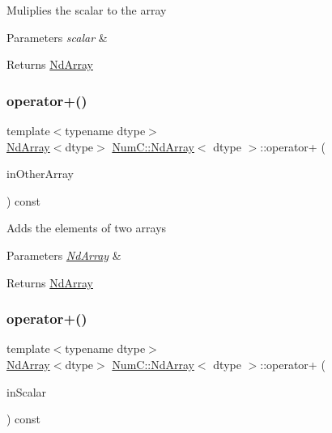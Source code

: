 Muliplies the scalar to the array


\begin{DoxyParams}{Parameters}
{\em scalar} & \\
\hline
\end{DoxyParams}
\begin{DoxyReturn}{Returns}
\mbox{\hyperlink{class_num_c_1_1_nd_array}{Nd\+Array}} 
\end{DoxyReturn}
\mbox{\label{class_num_c_1_1_nd_array_a910f4bbf7dc623d98a633c9490eb83c1}} 
\subsubsection{\texorpdfstring{operator+()}{operator+()}\hspace{0.1cm}{\footnotesize\ttfamily [1/2]}}
{\footnotesize\ttfamily template$<$typename dtype$>$ \\
\mbox{\hyperlink{class_num_c_1_1_nd_array}{Nd\+Array}}$<$dtype$>$ \mbox{\hyperlink{class_num_c_1_1_nd_array}{Num\+C\+::\+Nd\+Array}}$<$ dtype $>$\+::operator+ (\begin{DoxyParamCaption}\item[{const \mbox{\hyperlink{class_num_c_1_1_nd_array}{Nd\+Array}}$<$ dtype $>$ \&}]{in\+Other\+Array }\end{DoxyParamCaption}) const\hspace{0.3cm}{\ttfamily [inline]}}

Adds the elements of two arrays


\begin{DoxyParams}{Parameters}
{\em \mbox{\hyperlink{class_num_c_1_1_nd_array}{Nd\+Array}}} & \\
\hline
\end{DoxyParams}
\begin{DoxyReturn}{Returns}
\mbox{\hyperlink{class_num_c_1_1_nd_array}{Nd\+Array}} 
\end{DoxyReturn}
\mbox{\label{class_num_c_1_1_nd_array_afebba69128d3f3b5f72de7e4c952f4d5}} 
\subsubsection{\texorpdfstring{operator+()}{operator+()}\hspace{0.1cm}{\footnotesize\ttfamily [2/2]}}
{\footnotesize\ttfamily template$<$typename dtype$>$ \\
\mbox{\hyperlink{class_num_c_1_1_nd_array}{Nd\+Array}}$<$dtype$>$ \mbox{\hyperlink{class_num_c_1_1_nd_array}{Num\+C\+::\+Nd\+Array}}$<$ dtype $>$\+::operator+ (\begin{DoxyParamCaption}\item[{dtype}]{in\+Scalar }\end{DoxyParamCaption}) const\hspace{0.3cm}{\ttfamily [inline]}}

